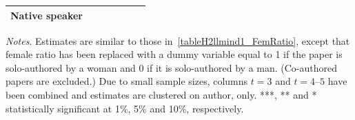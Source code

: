 \begin{table}[H]
\begin{threeparttable}
\begin{tabular}{p{3cm}S@{}S@{}S@{}S@{}S@{}S@{}}
            Native speaker                &           {}   &           {}   &           {}   &           {}   &           {}   \\
            \bottomrule
        \end{tabular}
        \begin{tablenotes}
            \tiny
            \item \textit{Notes}. Estimates are similar to those in~\autoref{tableH2llmind1_FemRatio}, except that female ratio has been replaced with a dummy variable equal to 1 if the paper is solo-authored by a woman and 0 if it is solo-authored by a man. (Co-authored papers are excluded.) Due to small sample sizes, columns \(t=3\) and \(t=4\text{--}5\) have been combined and estimates are clustered on author, only. ***, ** and * statistically significant at 1\%, 5\% and 10\%, respectively.
        \end{tablenotes}
    \end{threeparttable}
\end{table}